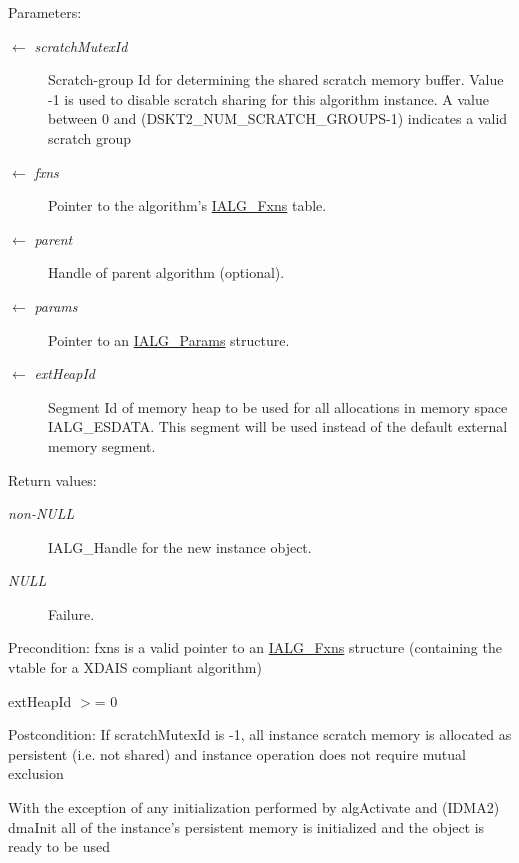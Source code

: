 \begin{Desc}
\item[Parameters:]
\begin{description}
\item[\mbox{$\leftarrow$} {\em scratch\-Mutex\-Id}]Scratch-group Id for determining the shared scratch memory buffer. Value -1 is used to disable scratch sharing for this algorithm instance. A value between 0 and (DSKT2\_\-NUM\_\-SCRATCH\_\-GROUPS-1) indicates a valid scratch group \item[\mbox{$\leftarrow$} {\em fxns}]Pointer to the algorithm's \hyperlink{struct_i_a_l_g___fxns}{IALG\_\-Fxns} table. \item[\mbox{$\leftarrow$} {\em parent}]Handle of parent algorithm (optional). \item[\mbox{$\leftarrow$} {\em params}]Pointer to an \hyperlink{struct_i_a_l_g___params}{IALG\_\-Params} structure. \item[\mbox{$\leftarrow$} {\em ext\-Heap\-Id}]Segment Id of memory heap to be used for all allocations in memory space IALG\_\-ESDATA. This segment will be used instead of the default external memory segment.\end{description}
\end{Desc}
\begin{Desc}
\item[Return values:]
\begin{description}
\item[{\em non-NULL}]IALG\_\-Handle for the new instance object. \item[{\em NULL}]Failure.\end{description}
\end{Desc}
\begin{Desc}
\item[Precondition:]fxns is a valid pointer to an \hyperlink{struct_i_a_l_g___fxns}{IALG\_\-Fxns} structure (containing the vtable for a XDAIS compliant algorithm)

ext\-Heap\-Id $>$= 0\end{Desc}
\begin{Desc}
\item[Postcondition:]If scratch\-Mutex\-Id is -1, all instance scratch memory is allocated as persistent (i.e. not shared) and instance operation does not require mutual exclusion

With the exception of any initialization performed by alg\-Activate and (IDMA2) dma\-Init all of the instance's persistent memory is initialized and the object is ready to be used\end{Desc}
